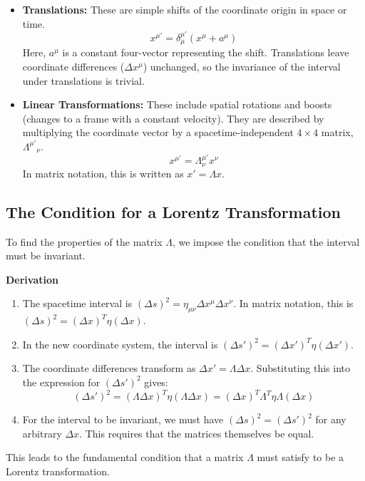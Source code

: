 \documentclass[11pt, a4paper]{report}
\begin{document}
\begin{itemize}
    \item \textbf{Translations:} These are simple shifts of the coordinate origin in space or time.
    \begin{equation}\label{eq:translation}
        x^{\mu'} = \delta^{\mu'}_\mu (x^\mu + a^\mu)
    \end{equation}
    Here, $a^\mu$ is a constant four-vector representing the shift. Translations leave coordinate differences ($\Delta x^\mu$) unchanged, so the invariance of the interval under translations is trivial.

    \item \textbf{Linear Transformations:} These include spatial rotations and boosts (changes to a frame with a constant velocity). They are described by multiplying the coordinate vector by a spacetime-independent $4 \times 4$ matrix, $\Lambda^{\mu'}{}_\nu$.
    \begin{equation}\label{eq:linear-transform}
        x^{\mu'} = \Lambda^{\mu'}_\nu x^\nu
    \end{equation}
    In matrix notation, this is written as $x' = \Lambda x$.
\end{itemize}

\subsection*{The Condition for a Lorentz Transformation}

To find the properties of the matrix $\Lambda$, we impose the condition that the interval must be invariant.

\textbf{Derivation}
\begin{enumerate}
    \item The spacetime interval is $(\Delta s)^2 = \eta_{\mu\nu} \Delta x^\mu \Delta x^\nu$. In matrix notation, this is $(\Delta s)^2 = (\Delta x)^T \eta (\Delta x)$.
    \item In the new coordinate system, the interval is $(\Delta s')^2 = (\Delta x')^T \eta (\Delta x')$.
    \item The coordinate differences transform as $\Delta x' = \Lambda \Delta x$. Substituting this into the expression for $(\Delta s')^2$ gives:
    \[
        (\Delta s')^2 = (\Lambda \Delta x)^T \eta (\Lambda \Delta x) = (\Delta x)^T \Lambda^T \eta \Lambda (\Delta x)
    \]
    \item For the interval to be invariant, we must have $(\Delta s)^2 = (\Delta s')^2$ for any arbitrary $\Delta x$. This requires that the matrices themselves be equal.
\end{enumerate}
This leads to the fundamental condition that a matrix $\Lambda$ must satisfy to be a Lorentz transformation.
\end{document}
